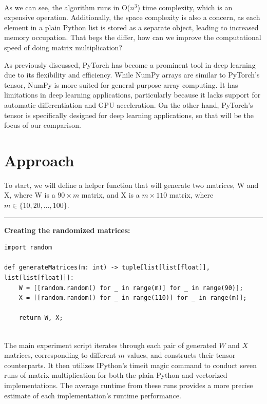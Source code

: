 \documentclass[12pt]{article}
\begin{document}
\noindent \\

As we can see, the algorithm runs in O(\( n^3 \)) time complexity, which is an expensive operation.
Additionally, the space complexity is also a concern, as each element in a plain Python list is stored as a separate object,
leading to increased memory occupation.
That begs the differ, how can we improve the computational speed of doing matrix multiplication?

As previously discussed, PyTorch has become a prominent tool in deep learning due to its flexibility and efficiency.
While NumPy arrays are similar to PyTorch's tensor, NumPy is more suited for general-purpose array computing.
It has limitations in deep learning applications, particularly because it lacks support for automatic differentiation and GPU acceleration.
On the other hand, PyTorch's tensor is specifically designed for deep learning applications,
so that will be the focus of our comparison.

\section{Approach}
To start, we will define a helper function that will generate two matrices, W and X, where
W is a \( 90 \times m \) matrix, and X is a \( m \times 110 \) matrix, where
\( m \in \{10, 20, ..., 100\} \).

\newpage

\noindent\rule{\textwidth}{0.4pt}
\noindent\textbf{Creating the randomized matrices:}
\begin{lstlisting}
import random

def generateMatrices(m: int) -> tuple[list[list[float]], list[list[float]]]:
    W = [[random.random() for _ in range(m)] for _ in range(90)];
    X = [[random.random() for _ in range(110)] for _ in range(m)];

    return W, X;
\end{lstlisting}

\noindent \\

\noindent The main experiment script iterates through each pair of generated \( W \) and \( X \) matrices,
corresponding to different \( m \) values, and constructs their tensor counterparts.
It then utilizes IPython's timeit magic command to conduct seven runs of matrix multiplication for both the plain Python and vectorized implementations.
The average runtime from these runs provides a more precise estimate of each implementation's runtime performance.
\end{document}
